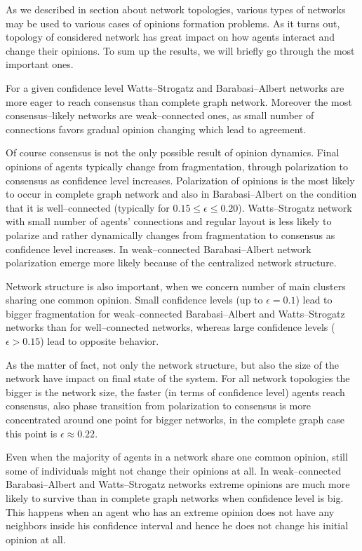 \documentclass[a4paper, 12pt]{article}
\begin{document}
As we described in section about network topologies, various types of networks may be used to various cases of opinions formation problems. As it turns out, topology of considered network has great impact on how agents interact and change their opinions. To sum up the results, we will briefly go through the most important ones.

\indent

For a given confidence level Watts--Strogatz and Barabasi--Albert networks are more eager to reach consensus than complete graph network. Moreover the most consensus--likely networks are weak--connected ones, as small number of connections favors gradual opinion changing which lead to agreement.

Of course consensus is not the only possible result of opinion dynamics. Final opinions of agents typically change from fragmentation, through polarization to consensus as confidence level increases. Polarization of opinions is the most likely to occur in complete graph network and also in Barabasi--Albert on the condition that it is well--connected (typically for $0.15 \leq \epsilon \leq 0.20$). Watts--Strogatz network with small number of agents' connections and regular layout is less likely to polarize and rather dynamically changes from fragmentation to consensus as confidence level increases. In weak--connected Barabasi--Albert network polarization emerge more likely because of the centralized network structure.

Network structure is also important, when we concern number of main clusters sharing one common opinion. Small confidence levels (up to $\epsilon=0.1$) lead to bigger fragmentation for weak--connected Barabasi--Albert and Watts--Strogatz networks than for well--connected networks, whereas large confidence levels ($\epsilon>0.15$) lead to opposite behavior.

As the matter of fact, not only the network structure, but also the size of the network have impact on final state of the system. For all network topologies the bigger is the network size, the faster (in terms of confidence level) agents reach consensus, also phase transition from polarization to consensus is more concentrated around one point for bigger networks, in the complete graph case this point is $\epsilon\approx0.22$.

Even when the majority of agents in a network share one common opinion, still some of individuals might not change their opinions at all. In weak--connected Barabasi--Albert and Watts--Strogatz networks extreme opinions are much more likely to survive than in complete graph networks when confidence level is big. This happens when an agent who has an extreme opinion does not have any neighbors inside his confidence interval and hence he does not change his initial opinion at all.
\end{document}
